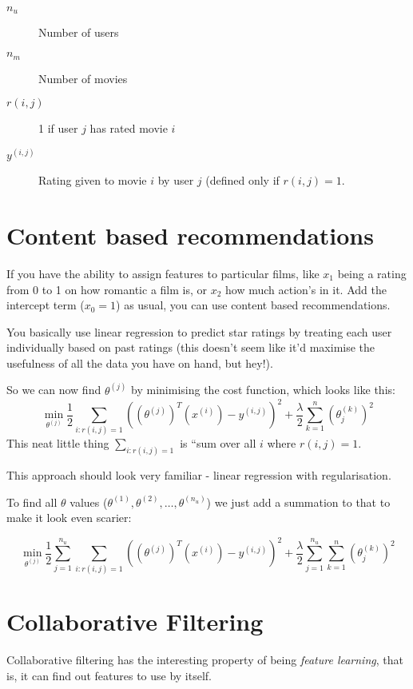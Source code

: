 \begin{description}
\item[$n_u$] Number of users
\item[$n_m$] Number of movies
\item[$r(i, j)$] 1 if user $j$ has rated movie $i$
\item[$y^{(i, j)}$] Rating given to movie $i$ by user $j$ (defined only if $r(i, j) = 1$.
\end{description}

\section{Content based recommendations}
If you have the ability to assign features to particular films, like $x_1$ being a rating from 0 to 1 on how romantic a film is, or $x_2$ how much action's in it. Add the intercept term ($x_0 = 1$) as usual, you can use content based recommendations.

You basically use linear regression to predict star ratings by treating each user individually based on past ratings (this doesn't seem like it'd maximise the usefulness of all the data you have on hand, but hey!).

So we can now find $\theta^{(j)}$ by minimising the cost function, which looks like this:
\[
\min_{\theta^{(j)}} \frac{1}{2}\sum_{i:r(i,j) = 1}
\left(
(\theta^{(j)})^T(x^{(i)}) - y^{(i, j)}
\right)^2
+
\frac{\lambda}{2}\sum^n_{k = 1}(\theta_j^{(k)})^2
\]
This neat little thing $\sum_{i:r(i,j) = 1}$ is ``sum over all $i$ where $r(i, j) = 1$.

This approach should look very familiar - linear regression with regularisation.

To find all $\theta$ values ($\theta^{(1)}, \theta^{(2)}, \dots, \theta^{(n_u)}$) we just add a summation to that to make it look even scarier:

\[
\min_{\theta^{(j)}} \frac{1}{2}
\sum_{j = 1}^{n_u}
\sum_{i:r(i,j) = 1}
\left(
(\theta^{(j)})^T(x^{(i)}) - y^{(i, j)}
\right)^2
+
\frac{\lambda}{2}
\sum_{j = 1}^{n_u}
\sum^n_{k = 1}(\theta_j^{(k)})^2
\]

\section{Collaborative Filtering}

Collaborative filtering has the interesting property of being \emph{feature learning}, that is, it can find out features to use by itself.

